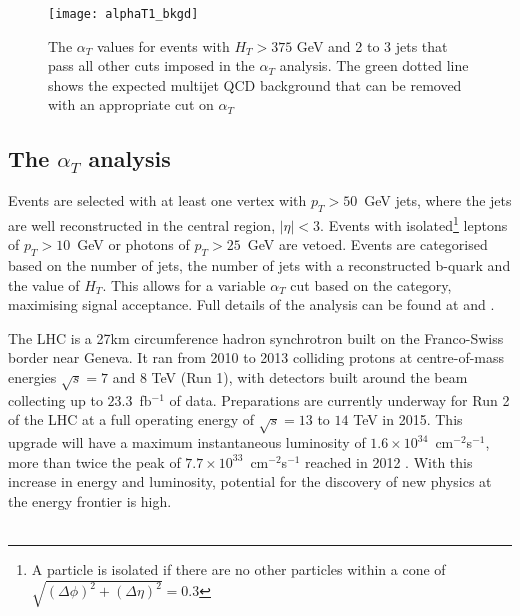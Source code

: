 \begin{figure}
	\begin{center}
		\texttt{[image: alphaT1\_bkgd]}
	\end{center}
	\caption{The $\alpha_T$ values for events with $H_T>375$ GeV and 2 to 3 jets that pass all other cuts imposed in the $\alpha_T$ analysis. The green dotted line shows the expected multijet QCD background that can be removed with an appropriate cut on $\alpha_T$ \cite{AlphaT8TeVChatrchyan:2013lya}}
	\label{fig:alphaT}
\end{figure}
\subsection{The \boldmath $\alpha_T$ analysis}
Events are selected with at least one vertex with $p_T>50$~GeV jets, where the jets are well reconstructed in the central region, $|\eta|<3$. Events with isolated\footnote{A particle is isolated if there are no other particles within a cone of $\sqrt{(\Delta\phi)^2+(\Delta\eta)^2}=0.3$} leptons of $p_T>10$~GeV or photons of $p_T>25$~GeV are vetoed. Events are categorised based on the number of jets, the number of jets with a reconstructed b-quark and the value of $H_T$. This allows for a variable $\alpha_T$ cut based on the category, maximising signal acceptance. Full details of the analysis can be found at \cite{AlphaT8TeVChatrchyan:2013lya} and \cite{AlphaT_7TeV_PRLChatrchyan:2011zy}.


The LHC is a 27km circumference hadron synchrotron built on the Franco-Swiss border \cite{LHCMachine} near Geneva. It ran from 2010 to 2013 colliding protons at centre-of-mass energies $\sqrt{s}=7$ and $8$ TeV (Run 1), with detectors built around the beam collecting up to $23.3$~fb$^{-1}$ of data. Preparations are currently underway for Run 2 of the LHC at a full operating energy of $\sqrt{s}=13$ to $14$ TeV in 2015. This upgrade will have a maximum instantaneous luminosity of $1.6\times10^{34}$~cm$^{-2}$s$^{-1}$, more than twice the peak of $7.7\times10^{33}$~cm$^{-2}$s$^{-1}$ reached in 2012 \cite{LHCLuminosityIPAC13}. With this increase in energy and luminosity, potential for the discovery of new physics at the energy frontier is high.  
\\\\
